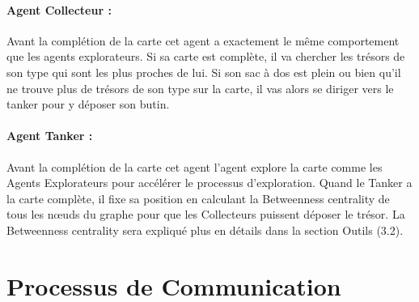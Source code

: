 \documentclass[10pt]{article}
\begin{document}
\paragraph{Agent Collecteur :} Avant la complétion de la carte cet agent a exactement le même comportement que les agents explorateurs. Si sa carte est complète, il va chercher les trésors de son type qui sont les plus proches de lui. Si son sac à dos est plein ou bien qu'il ne trouve plus de trésors de son type sur la carte, il vas alors se diriger vers le tanker pour y déposer son butin.

\paragraph{Agent Tanker :} Avant la complétion de la carte cet agent l'agent explore la carte comme les Agents Explorateurs pour accélérer le processus d'exploration. Quand le Tanker a la carte complète, il fixe sa position en calculant la Betweenness centrality de tous les nœuds du graphe pour que les Collecteurs puissent déposer le trésor. La Betweenness centrality sera expliqué plus en détails dans la section Outils (3.2).

\section{Processus de Communication}
\end{document}
